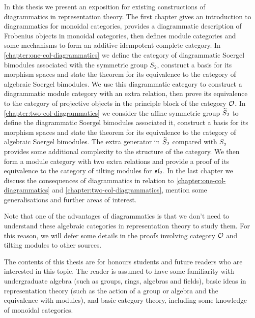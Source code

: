 In this thesis we present an exposition for existing constructions of diagrammatics in representation theory. The first chapter gives an introduction to diagrammatics for monoidal categories, provides a diagrammatic description of Frobenius objects in monoidal categories, then defines module categories and some mechanisms to form an additive idempotent complete category. In \autoref{chapter:one-col-diagrammatics} we define the category of diagrammatic Soergel bimodules associated with the symmetric group $S_2$, construct a basis for its morphism spaces and state the theorem for its equivalence to the category of algebraic Soergel bimodules. We use this diagrammatic category to construct a diagrammatic module category with an extra relation, then prove its equivalence to the category of projective objects in the principle block of the category $\mathcal{O}$. In \autoref{chapter:two-col-diagrammatics} we consider the affine symmetric group $\widetilde{S}_2$ to define the diagrammatic Soergel bimodules associated it, construct a basis for its morphism spaces and state the theorem for its equivalence to the category of algebraic Soergel bimodules. The extra generator in $\widetilde{S}_2$ compared with $S_2$ provides some additional complexity to the structure of the category. We then form a module category with two extra relations and provide a proof of its equivalence to the category of tilting modules for $\operatorname{\mathfrak{sl}}_2$. In the last chapter we discuss the consequences of diagrammatics in relation to \autoref{chapter:one-col-diagrammatics} and \autoref{chapter:two-col-diagrammatics}, mention some generalisations and further areas of interest.

Note that one of the advantages of diagrammatics is that we don't need to understand these algebraic categories in representation theory to study them. For this reason, we will defer some details in the proofs involving category $\mathcal{O}$ and tilting modules to other sources.

The contents of this thesis are for honours students and future readers who are interested in this topic. The reader is assumed to have some familiarity with undergraduate algebra (such as groups, rings, algebras and fields), basic ideas in representation theory (such as the action of a group or algebra and the equivalence with modules), and basic category theory, including some knowledge of monoidal categories.
